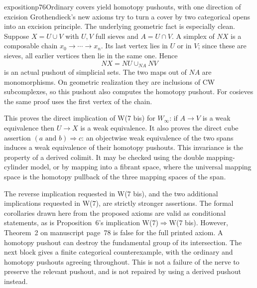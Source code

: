 \begin{dcomment}{exposition}{p76}{Ordinary covers yield homotopy pushouts, with one direction of excision}
Grothendieck's new axioms try to turn a cover by two categorical opens into an excision principle. The underlying geometric fact is especially clean. Suppose $X=U\cup V$ with $U,V$ full sieves and $A=U\cap V$. A simplex of $NX$ is a composable chain $x_0\to\cdots\to x_n$. Its last vertex lies in $U$ or in $V$; since these are sieves, all earlier vertices then lie in the same one. Hence
\[
 NX=NU\cup_{NA}NV
\]
is an actual pushout of simplicial sets. The two maps out of $NA$ are monomorphisms. On geometric realization they are inclusions of CW subcomplexes, so this pushout also computes the homotopy pushout. For cosieves the same proof uses the first vertex of the chain.

This proves the direct implication of W(7 bis) for $W_\infty$: if $A\to V$ is a weak equivalence then $U\to X$ is a weak equivalence. It also proves the direct cube assertion $(a\text{ and }b)\Rightarrow c$: an objectwise weak equivalence of the two spans induces a weak equivalence of their homotopy pushouts. This invariance is the property of a derived colimit. It may be checked using the double mapping-cylinder model, or by mapping into a fibrant space, where the universal mapping space is the homotopy pullback of the three mapping spaces of the span.

The reverse implication requested in W(7 bis), and the two additional implications requested in W(7), are strictly stronger assertions. The formal corollaries drawn here from the proposed axioms are valid as conditional statements, as is Proposition~6's implication W(7)$\Rightarrow$W(7 bis). However, Theorem~2 on manuscript page~78 is false for the full printed axiom. A homotopy pushout can destroy the fundamental group of its intersection. The next block gives a finite categorical counterexample, with the ordinary and homotopy pushouts agreeing throughout. This is not a failure of the nerve to preserve the relevant pushout, and is not repaired by using a derived pushout instead.
\end{dcomment}

